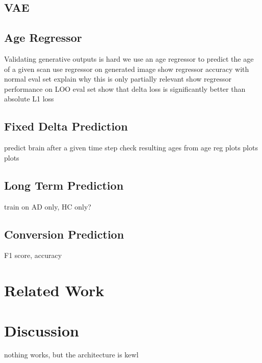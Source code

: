 \section{VAE}

\section{Age Regressor}
Validating generative outputs is hard
we use an age regressor to predict the age of a given scan
use regressor on generated image
show regressor accuracy with normal eval set
explain why this is only partially relevant
show regressor performance on LOO eval set
show that delta loss is significantly better than absolute L1 loss

\section{Fixed Delta Prediction}
predict brain after a given time step
check resulting ages from age reg
plots plots plots

\section{Long Term Prediction}
train on AD only, HC only?

\section{Conversion Prediction}
F1 score, accuracy

\chapter{Related Work}

\chapter{Discussion}
nothing works, but the architecture is kewl
